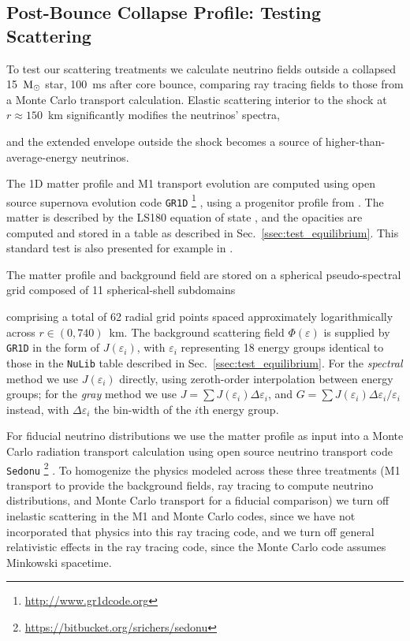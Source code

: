 \documentclass[aps,floatfix,prd,superscriptaddress,twocolumn]{revtex4-1}
\newcommand{\todo}[1]{\marginpar{\tiny{\textcolor{red}{#1}}}}
\renewcommand\todo[1]{} %
\begin{document}
\subsection{Post-Bounce Collapse Profile:
  Testing Scattering}
\label{ssec:test_collapse}
To test our scattering treatments we calculate neutrino fields outside a
collapsed 15~${\rm M}_\odot$ star, 100~ms after core bounce,
comparing ray tracing fields to those from a Monte Carlo transport calculation.
Elastic scattering interior to the shock at $r\approx150$~km
significantly modifies the neutrinos' spectra,
\todo{demonstrate}
and the extended envelope outside the shock becomes a source of
higher-than-average-energy neutrinos.

The 1D matter profile and M1 transport evolution are computed using
open source supernova evolution code \lstinline{GR1D}
\footnote{\url{http://www.gr1dcode.org}}
\cite{ocon2010-gr1d, ocon2015-gr1d_with_nu},
using a progenitor profile from \cite{woos1995-sn_progenitors}.
The matter is described by the LS180 equation of state \cite{latt1991-nuc_eos},
and the opacities are computed and stored in a table
as described in Sec.~\ref{ssec:test_equilibrium}.
This standard test is also presented for example in
\cite{ocon2015-gr1d_with_nu,fouc2015-m1_nsbh,abdi2012-monte_carlo}.
\todo{also lieb2005, mull2010}

The matter profile and background field are stored on a spherical
pseudo-spectral grid composed of 11 spherical-shell subdomains
\todo{cite early SpEC paper}
comprising a total of 62 radial grid points spaced approximately
logarithmically across $r\in(0,740)$~km.
The background scattering field $\Phi(\varepsilon)$ is supplied by
\lstinline{GR1D} in the form of $J(\varepsilon_i)$,
with $\varepsilon_i$ representing 18 energy groups
identical to those in the \lstinline{NuLib} table described in
Sec.~\ref{ssec:test_equilibrium}.
For the \emph{spectral} method we use $J(\varepsilon_i)$ directly,
using zeroth-order interpolation between energy groups;
for the \emph{gray} method we use $J=\sum J(\varepsilon_i) \Delta\varepsilon_i$,
and $G=\sum J(\varepsilon_i) \Delta\varepsilon_i/\varepsilon_i$ instead,
with $\Delta\varepsilon_i$ the bin-width of the $i$th energy group.

For fiducial neutrino distributions we use the matter profile
as input into a Monte Carlo radiation transport calculation using
open source neutrino transport code \lstinline{Sedonu}
\footnote{\url{https://bitbucket.org/srichers/sedonu}}
\cite{rich2015-monte_carlo}.
To homogenize the physics modeled across these three treatments
(M1 transport to provide the background fields,
ray tracing to compute neutrino distributions, and
Monte Carlo transport for a fiducial comparison)
we turn off inelastic scattering in the M1 and Monte Carlo codes,
since we have not incorporated that physics into this ray tracing code,
and we turn off general relativistic effects in the ray tracing code,
since the Monte Carlo code assumes Minkowski spacetime.
\end{document}
